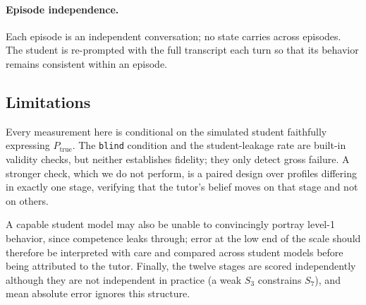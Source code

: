 \paragraph{Episode independence.} Each episode is an independent conversation;
no state carries across episodes. The student is re-prompted with the full
transcript each turn so that its behavior remains consistent within an
episode.

\subsection{Limitations}
\label{app:limitations}

Every measurement here is conditional on the simulated student faithfully
expressing $P_{\text{true}}$. The \texttt{blind} condition and the
student-leakage rate are built-in validity checks, but neither establishes
fidelity; they only detect gross failure. A stronger check, which we do not
perform, is a paired design over profiles differing in exactly one stage,
verifying that the tutor's belief moves on that stage and not on others.

A capable student model may also be unable to convincingly portray level-1
behavior, since competence leaks through; error at the low end of the scale
should therefore be interpreted with care and compared across student models
before being attributed to the tutor. Finally, the twelve stages are scored
independently although they are not independent in practice (a weak $S_3$
constrains $S_7$), and mean absolute error ignores this structure.
